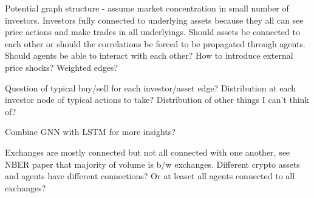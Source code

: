 \documentclass[12pt]{article}
\begin{document}
Potential graph structure - assume market concentration in small number of investors. Investors fully connected to underlying assets because they all can see price actions and make trades in all underlyings. Should assets be connected to each other or should the correlations be forced to be propagated through agents. Should agents be able to interact with each other? How to introduce external price shocks? Weighted edges?

Question of typical buy/sell for each investor/asset edge? Distribution at each investor node of typical actions to take? Distribution of other things I can't think of?

Combine GNN with LSTM for more insights?

Exchanges are mostly connected but not all connected with one another, see NBER paper that majority of volume is b/w exchanges. Different crypto assets and agents have different connections? Or at leaset all agents connected to all exchanges?

\begin{center}
\end{center}
\end{document}
